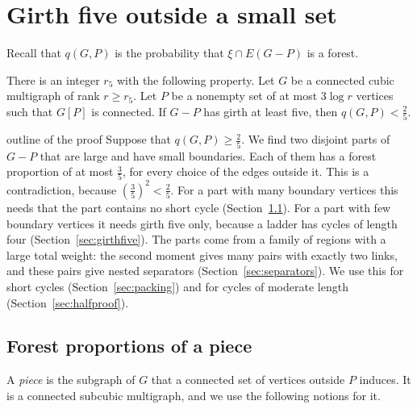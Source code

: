 \section{Girth five outside a small set}\label{sec:half}

Recall that $q(G,P)$ is the probability that $\xi\cap E(G-P)$ is a forest.

\begin{theorem}\label{thm:half}
There is an integer $r_5$ with the following property. Let $G$ be a connected cubic multigraph of
rank $r\ge r_5$. Let $P$ be a nonempty set of at most $3\log r$ vertices such that $G[P]$ is
connected. If $G-P$ has girth at least five, then $q(G,P)<\frac25$.
\end{theorem}

\begin{idea}{outline of the proof}
Suppose that $q(G,P)\ge\frac25$. We find two disjoint parts of $G-P$ that are large and have
small boundaries. Each of them has a forest proportion of at most $\frac35$, for every choice of
the edges outside it. This is a contradiction, because $(\frac35)^{2}<\frac25$. For a part with
many boundary vertices this needs that the part contains no short cycle
(Section~\ref{sec:affine}). For a part with few boundary vertices it needs girth five only,
because a ladder has cycles of length four (Section~\ref{sec:girthfive}). The parts come from a family of regions with a large total weight:
the second moment gives many pairs with exactly two links, and these pairs give nested separators
(Section~\ref{sec:separators}). We use this for short cycles (Section~\ref{sec:packing}) and
for cycles of moderate length (Section~\ref{sec:halfproof}).
\end{idea}

\subsection{Forest proportions of a piece}\label{sec:affine}

A \emph{piece} is the subgraph of $G$ that a connected set of vertices outside $P$ induces. It is
a connected subcubic multigraph, and we use the following notions for it.

